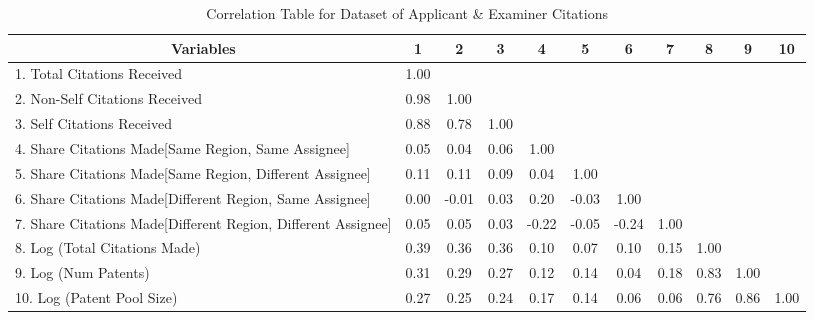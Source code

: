 \documentclass[12pt,letterpaper]{article}
\begin{document}
\begin{center}
\begin{table}[htbp]\centering \caption{Correlation Table for Dataset of Applicant \& Examiner Citations \label{ae.corrtable}}
\scriptsize
\singlespacing
\begin{adjustbox}{angle=0}
\begin{tabular}{l  c  c  c  c  c  c  c  c  c  c }

\hline
\multicolumn{1}{c}{Variables} &1&2&3&4&5&6&7&8&9&10\\ \hline
1. Total Citations Received&1.00\\
2. Non-Self Citations Received&0.98&1.00\\
3. Self Citations Received&0.88&0.78&1.00\\
4. Share Citations Made[Same Region, Same Assignee]&0.05&0.04&0.06&1.00\\
5. Share Citations Made[Same Region, Different Assignee]&0.11&0.11&0.09&0.04&1.00\\
6. Share Citations Made[Different Region, Same Assignee]&0.00&-0.01&0.03&0.20&-0.03&1.00\\
7. Share Citations Made[Different Region, Different Assignee]&0.05&0.05&0.03&-0.22&-0.05&-0.24&1.00\\
8. Log (Total Citations Made)&0.39&0.36&0.36&0.10&0.07&0.10&0.15&1.00\\
9. Log (Num Patents)&0.31&0.29&0.27&0.12&0.14&0.04&0.18&0.83&1.00\\
10. Log (Patent Pool Size)&0.27&0.25&0.24&0.17&0.14&0.06&0.06&0.76&0.86&1.00\\ \hline
\end{tabular}
\end{adjustbox}
\end{table}
\end{center}
\end{document}
